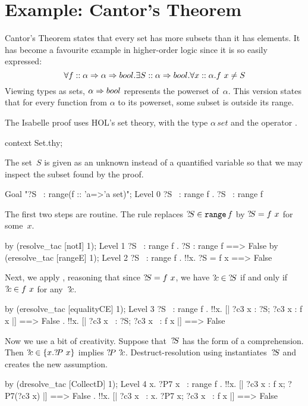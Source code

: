 \goodbreak
\section{Example: Cantor's Theorem}\label{sec:hol-cantor}
Cantor's Theorem states that every set has more subsets than it has
elements.  It has become a favourite example in higher-order logic since
it is so easily expressed:
\[  \forall f::\alpha \Rightarrow \alpha \Rightarrow bool. \exists S::\alpha\Rightarrow bool.
    \forall x::\alpha. f~x \not= S 
\] 
%
Viewing types as sets, $\alpha\Rightarrow bool$ represents the powerset
of~$\alpha$.  This version states that for every function from $\alpha$ to
its powerset, some subset is outside its range.  

The Isabelle proof uses HOL's set theory, with the type $\alpha\,set$ and
the operator .
\begin{ttbox}
context Set.thy;
\end{ttbox}
The set~$S$ is given as an unknown instead of a
quantified variable so that we may inspect the subset found by the proof.
\begin{ttbox}
Goal "?S ~: range\thinspace(f :: 'a=>'a set)";
{\out Level 0}
{\out ?S ~: range f}
{. ?S ~: range f}
\end{ttbox}
The first two steps are routine.  The rule  replaces
${?\!S}\in \texttt{range} \, f$ by ${?\!S}=f~x$ for some~$x$.
\begin{ttbox}
by (resolve_tac [notI] 1);
{\out Level 1}
{\out ?S ~: range f}
{. ?S : range f ==> False}
\ttbreak
by (eresolve_tac [rangeE] 1);
{\out Level 2}
{\out ?S ~: range f}
{. !!x. ?S = f x ==> False}
\end{ttbox}
Next, we apply , reasoning that since ${?\!S}=f~x$,
we have ${?\!c}\in {?\!S}$ if and only if ${?\!c}\in f~x$ for
any~${?\!c}$.
\begin{ttbox}
by (eresolve_tac [equalityCE] 1);
{\out Level 3}
{\out ?S ~: range f}
{. !!x. [| ?c3 x : ?S; ?c3 x : f x |] ==> False}
{. !!x. [| ?c3 x ~: ?S; ?c3 x ~: f x |] ==> False}
\end{ttbox}
Now we use a bit of creativity.  Suppose that~${?\!S}$ has the form of a
comprehension.  Then ${?\!c}\in\{x.{?\!P}~x\}$ implies
${?\!P}~{?\!c}$.   Destruct-resolution using 
instantiates~${?\!S}$ and creates the new assumption.
\begin{ttbox}
by (dresolve_tac [CollectD] 1);
{\out Level 4}
{\out {\ttlbrace}x. ?P7 x{\ttrbrace} ~: range f}
{. !!x. [| ?c3 x : f x; ?P7(?c3 x) |] ==> False}
{. !!x. [| ?c3 x ~: {\ttlbrace}x. ?P7 x{\ttrbrace}; ?c3 x ~: f x |] ==> False}
\end{ttbox}

